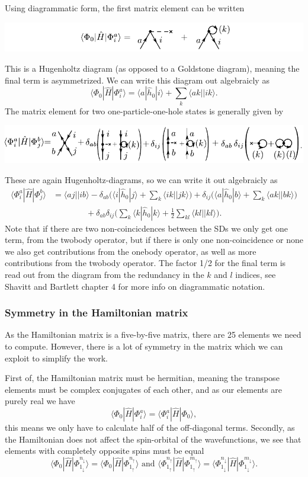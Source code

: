 \documentclass[a4paper, 11pt, notitlepage, english]{article}
\newcommand{\brakket}[2]{\langle #1 || #2 \rangle}
\newcommand{\op}[1]{\hat{#1}}
\newcommand{\braopket}[3]{\langle #1 | {#2} | #3 \rangle}
\renewcommand{\d}{{\rm d}}
\renewcommand{\u}{\uparrow}
\renewcommand{\d}{\downarrow}
\begin{document}
Using diagrammatic form, the first matrix element can be written
\begin{center}
\includegraphics{project1c_1}
\end{center}
This is a Hugenholtz diagram (as opposed to a Goldstone diagram), meaning the final term is asymmetrized. We can write this diagram out algebraicly as
$$\braopket{\Phi_0}{\op{H}}{\Phi_i^a} = \braopket{a}{\op{h}_0}{i} + \sum_{k} \brakket{ak}{ik}.$$
The matrix element for two one-particle-one-hole states is generally given by
\begin{center}
\includegraphics{project1c_2}
\end{center}
These are again Hugenholtz-diagrams, so we can write it out algebraicly as
\begin{align*}
\braopket{\Phi_i^a}{\op{H}}{\Phi_j^b} &= \brakket{aj}{ib} -\delta_{ab}\bigg(\braopket{i}{\op{h}_0}{j} + \sum_{k} \brakket{ik}{jk}\bigg) + \delta_{ij}\bigg(\braopket{a}{\op{h}_0}{b} + \sum_{k} \brakket{ak}{bk}\bigg) \\
&\qquad\qquad + \delta_{ab}\delta_{ij}\bigg(\sum_{k} \braopket{k}{\op{h}_0}{k} + \frac{1}{2}\sum_{kl}\brakket{kl}{kl}\bigg).
\end{align*}
Note that if there are two non-coincicdences between the SDs we only get one term, from the twobody operator, but if there is only one non-coincidence or none we also get contributions from the onebody operator, as well as more contributions from the twobody operator. The factor 1/2 for the final term is read out from the diagram from the redundancy in the $k$ and $l$ indices, see Shavitt and Bartlett chapter 4 for more info on diagrammatic notation.

\subsubsection*{Symmetry in the Hamiltonian matrix}
As the Hamiltonian matrix is a five-by-five matrix, there are 25 elements we need to compute. However, there is a lot of symmetry in the matrix which we can exploit to simplify the work.

First of, the Hamiltonian matrix must be hermitian, meaning the transpose elements must be complex conjugates of each other, and as our elements are purely real we have
$$
\braopket{\Phi_0}{\op{H}}{\Phi_i^a} = \braopket{\Phi_i^a}{\op{H}}{\Phi_0},
$$
this means we only have to calculate half of the off-diagonal terms.
Secondly, as the Hamiltonian does not affect the spin-orbital of the wavefunctions, we see that elements with completely opposite spins must be equal
$$\braopket{\Phi_0}{\op{H}}{\Phi_{1_\d}^{n_\d}} = \braopket{\Phi_0}{\op{H}}{\Phi_{1_\u}^{n_\u}} \mbox{  and  } \braopket{\Phi_{1_\u}^{n_\u}}{\op{H}}{\Phi_{1_\u}^{m_\u}} = \braopket{\Phi_{1_\d}^{n_\d}}{\op{H}}{\Phi_{1_\d}^{m_\d}}.$$
\end{document}

